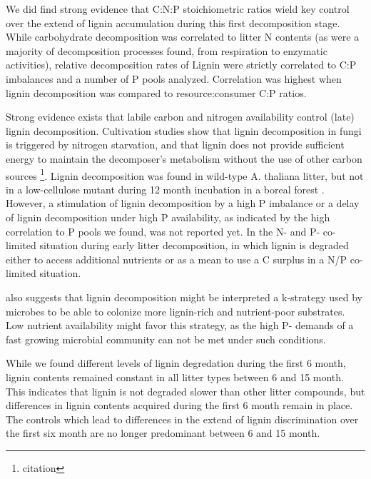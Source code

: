 \documentclass[10pt]{article}
\begin{document}
We did find strong evidence that C:N:P stoichiometric ratios wield key control over the extend of lignin accumulation during this first decomposition stage. While carbohydrate decomposition was correlated to litter N contents (as were a majority of decomposition processes found, from respiration to enzymatic activities), relative decomposition rates of Lignin were strictly correlated to C:P imbalances and a number of P pools analyzed. Correlation was highest when lignin decomposition was compared to resource:consumer C:P ratios.


Strong evidence exists that labile carbon and nitrogen availability control (late) lignin decomposition. Cultivation studies show that lignin decomposition in fungi is triggered by nitrogen starvation, and that lignin does not provide sufficient energy to maintain the decomposer's metabolism without the use of other carbon sources \footnote{citation}. Lignin decomposition was found in wild-type A. thaliana litter, but not in a low-cellulose mutant during 12 month incubation in a boreal forest \cite{Talbot2011}. However, a stimulation of lignin decomposition by a high P imbalance or a delay of lignin decomposition under high P availability, as indicated by the high correlation to P pools we found, was not reported yet. In the N- and P- co-limited situation during early litter decomposition, in which lignin is degraded either to access additional nutrients or as a mean to use a C surplus in a N/P co-limited situation. 

\cite{Talbot2011} also suggests that lignin decomposition might be interpreted a k-strategy used by microbes to be able to colonize more lignin-rich and nutrient-poor substrates. Low nutrient availability might favor this strategy, as the high P- demands of a fast growing microbial community can not be met under such conditions.

While we found different levels of lignin degredation during the first 6 month, lignin contents remained constant in all litter types between 6 and 15 month. This indicates that lignin is not degraded slower than other litter compounds, but differences in lignin contents acquired during the first 6 month remain in place. The controls which lead to differences in the extend of lignin discrimination over the first six month are no longer predominant between 6 and 15 month. 
\end{document}
